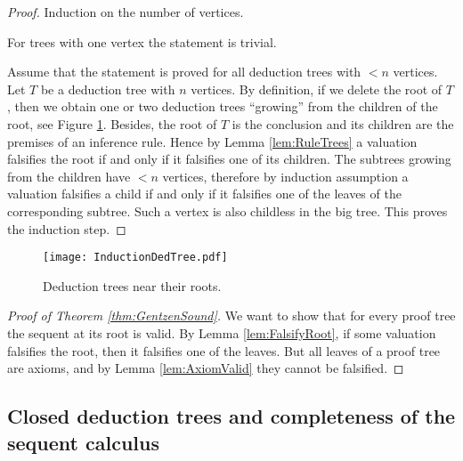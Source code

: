 \begin{page}
\setcounter{section}{2}
\setcounter{subsection}{7}
\setcounter{dfn}{16}
\label{portion:534}

\begin{proof}
Induction on the number of vertices.

For trees with one vertex the statement is trivial.

Assume that the statement is proved for all deduction trees with $< n$ vertices.
Let $T$ be a deduction tree with $n$ vertices.
By definition, if we delete the root of $T$, then we obtain one or two deduction trees ``growing'' from the children of the root,
see Figure \ref{fig:InductionDedTree}.
Besides, the root of $T$ is the conclusion and its children are the premises of an inference rule.
Hence by Lemma \ref{lem:RuleTrees} a valuation falsifies the root if and only if it falsifies one of its children.
The subtrees growing from the children have $< n$ vertices,
therefore by induction assumption a valuation falsifies a child if and only if it falsifies one of the leaves of the corresponding subtree.
Such a vertex is also childless in the big tree.
This proves the induction step.
\end{proof}

\begin{figure}[ht]
\begin{center}
\texttt{[image: InductionDedTree.pdf]}
\end{center}
\caption{Deduction trees near their roots.}
\label{fig:InductionDedTree}
\end{figure}

\begin{proof}[Proof of Theorem \ref{thm:GentzenSound}]
We want to show that for every proof tree the sequent at its root is valid.
By Lemma \ref{lem:FalsifyRoot}, if some valuation falsifies the root, then it falsifies one of the leaves.
But all leaves of a proof tree are axioms, and by Lemma \ref{lem:AxiomValid} they cannot be falsified.
\end{proof}



\end{page}

\begin{page}
\setcounter{section}{2}
\setcounter{subsection}{7}
\setcounter{dfn}{16}
\label{portion:536}

\subsection{Closed deduction trees and completeness of the sequent calculus}

\end{page}

